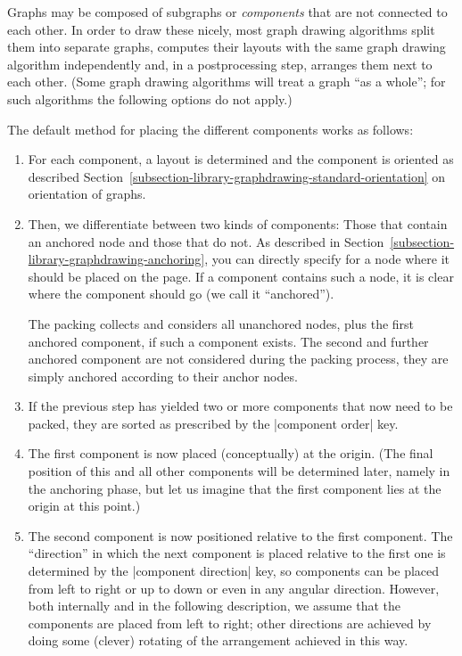 {\label{subsection-gd-component-packing}

Graphs may be composed of subgraphs or \emph{components} that are not
connected to each other. In order to draw these nicely, most graph
drawing algorithms split them into separate graphs, computes
their layouts with the same graph drawing algorithm independently and,
in a postprocessing step, arranges them next to each other. (Some
graph drawing algorithms will treat a graph ``as a whole''; for such
algorithms the following options do not apply.)

The default method for placing the different components works as
follows:

\begin{enumerate}
\item For each component, a layout is determined and the component is
  oriented as described
  Section~\ref{subsection-library-graphdrawing-standard-orientation}
  on orientation of graphs. 
\item Then, we differentiate between two kinds of components: Those
  that contain an anchored node and those that do not. As described in
  Section~\ref{subsection-library-graphdrawing-anchoring}, you can
  directly specify for a node where it should be placed on the
  page. If a component contains such a node, it is clear where the
  component should go (we call it ``anchored'').
  
  The packing collects and considers all unanchored nodes, plus the
  first anchored component, if such a component exists. The second and
  further anchored component are not considered during the packing
  process, they are simply anchored according to their anchor nodes. 
\item If the previous step has yielded two or more components that now
  need to be packed, they are sorted as prescribed by the
  |component order| key.
\item The first component is now placed (conceptually) at the
  origin. (The final position of this and all other components will be
  determined later, namely in the anchoring phase, but let us imagine
  that the first component lies at the origin at this point.)
\item The second component is now positioned relative to the first
  component. The ``direction'' in which the next component is placed
  relative to the first one is determined by the |component direction|
  key, so components can be placed from left to right or up to down or
  even in any angular direction. However, both internally and in the
  following description, we assume that the components are placed from
  left to right; other directions are achieved by doing some (clever)
  rotating of the arrangement achieved in this way.


\end{enumerate}}

